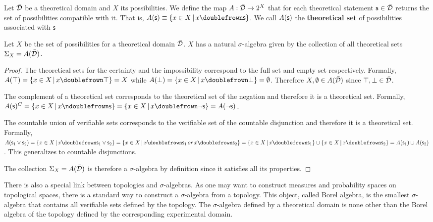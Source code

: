 \documentclass[11pt,letterpaper,fleqn]{memoir} %
\begin{document}
\begin{mathSection}
	
	\begin{defn}
		Let $\bar{\mathcal{D}}$ be a theoretical domain and $X$ its possibilities. We define the map $A : \bar{\mathcal{D}} \rightarrow 2^X$ that for each theoretical statement $\mathsf{s} \in \bar{\mathcal{D}}$ returns the set of possibilities compatible with it. That is, $A(\stmt)\equiv\{ x \in X \, | \, x \comp \stmt\}$. We call $A(\mathsf{s})$ the \textbf{theoretical set} of possibilities associated with $\mathsf{s}$
	\end{defn}
	
	\begin{prop}
		Let $X$ be the set of possibilities for a theoretical domain $\bar{\mathcal{D}}$. $X$ has a natural $\sigma$-algebra given by the collection of all theoretical sets $\Sigma_X=A(\bar{\mathcal{D}})$.
	\end{prop}
	
	\begin{proof}
	The theoretical sets for the certainty and the impossibility correspond to the full set and empty set respectively. Formally, $A(\certainty) = \{ x \in X \, | \, x \comp \certainty\} = X$ while $A(\impossibility) = \{ x \in X \, | \, x \comp \impossibility\} = \emptyset$. Therefore $X, \emptyset \in A(\bar{\mathcal{D}})$ since $\top, \bot \in \bar{\mathcal{D}}$.

	The complement of a theoretical set corresponds to the theoretical set of the negation and therefore it is a theoretical set. Formally, $A(\stmt)^C = \{ x \in X \, | \, x \ncomp \stmt\} =  \{ x \in X \, | \, x \comp \NOT\stmt\} = A(\NOT\stmt)$.

	The countable union of verifiable sets corresponds to the verifiable set of the countable disjunction and therefore it is a theoretical set. Formally, $A(\stmt_1\OR\stmt_2) = \{ x \in X \, | \, x \comp \stmt_1\OR\stmt_2\} =  \{ x \in X \, | \, x \comp \stmt_1 \, or \, x \comp \stmt_2\} = \{ x \in X \, | \, x \comp \stmt_1\} \cup \{ x \in X \, | \, x \comp \stmt_2\} = A(\stmt_1) \cup A(\stmt_2)$. This generalizes to countable disjunctions.

	The collection $\Sigma_X=A(\bar{\mathcal{D}})$ is therefore a $\sigma$-algebra by definition since it satisfies all its properties.
	\end{proof}
\end{mathSection}

There is also a special link between topologies and $\sigma$-algebras. As one may want to construct measures and probability spaces on topological spaces, there is a standard way to construct a $\sigma$-algebra from a topology. This object, called Borel algebra, is the smallest $\sigma$-algebra that contains all verifiable sets defined by the topology. The $\sigma$-algebra defined by a theoretical domain is none other than the Borel algebra of the topology defined by the corresponding experimental domain.
\end{document}
